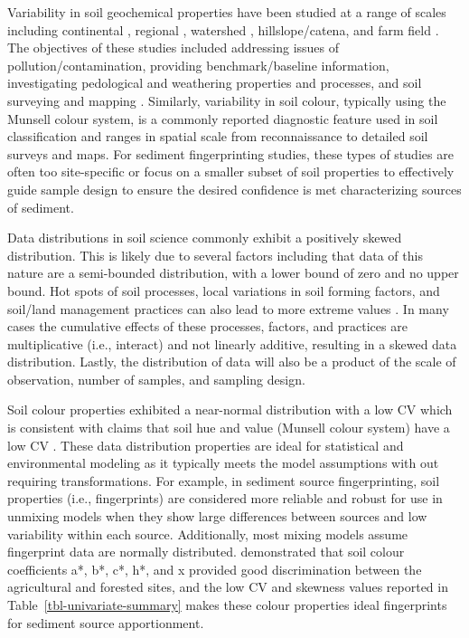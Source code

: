 \documentclass[
  number]{elsarticle}
\begin{document}
Variability in soil geochemical properties have been studied at a range
of scales including continental \citep{drew2010}, regional
\citep{rattenbury2018}, watershed \citep{nanos2012}, hillslope/catena,
and farm field \citep{sun2021a}. The objectives of these studies
included addressing issues of pollution/contamination, providing
benchmark/baseline information, investigating pedological and weathering
properties and processes, and soil surveying and mapping
\citep{wilson2008}. Similarly, variability in soil colour, typically
using the Munsell colour system, is a commonly reported diagnostic
feature used in soil classification and ranges in spatial scale from
reconnaissance to detailed soil surveys and maps. For sediment
fingerprinting studies, these types of studies are often too
site-specific or focus on a smaller subset of soil properties to
effectively guide sample design to ensure the desired confidence is met
characterizing sources of sediment.

Data distributions in soil science commonly exhibit a positively skewed
distribution. This is likely due to several factors including that data
of this nature are a semi-bounded distribution, with a lower bound of
zero and no upper bound. Hot spots of soil processes, local variations
in soil forming factors, and soil/land management practices can also
lead to more extreme values \citep[e.g.,][]{vidon2010}. In many cases
the cumulative effects of these processes, factors, and practices are
multiplicative (i.e., interact) and not linearly additive, resulting in
a skewed data distribution. Lastly, the distribution of data will also
be a product of the scale of observation, number of samples, and
sampling design.

Soil colour properties exhibited a near-normal distribution with a low
CV which is consistent with claims that soil hue and value (Munsell
colour system) have a low CV \citep{pennock2008}. These data
distribution properties are ideal for statistical and environmental
modeling as it typically meets the model assumptions with out requiring
transformations. For example, in sediment source fingerprinting, soil
properties (i.e., fingerprints) are considered more reliable and robust
for use in unmixing models when they show large differences between
sources and low variability within each source. Additionally, most
mixing models assume fingerprint data are normally distributed.
\citep{lunamiño2024} demonstrated that soil colour coefficients a*, b*,
c*, h*, and x provided good discrimination between the agricultural and
forested sites, and the low CV and skewness values reported in
Table~\ref{tbl-univariate-summary} makes these colour properties ideal
fingerprints for sediment source apportionment.
\end{document}
